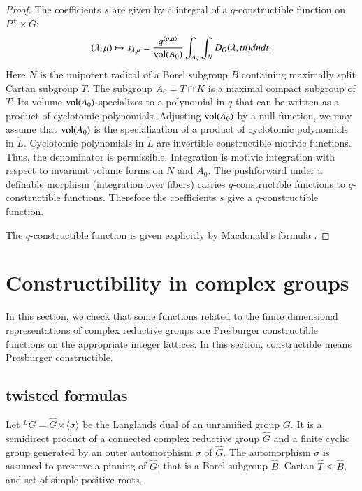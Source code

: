 \begin{proof} 
The coefficients $s$ are given by a integral of a $q$-constructible function on $P^+\times G$:
\[
(\lambda,\mu)\mapsto s_{\lambda,\mu}=\frac{q^{\langle \rho,\mu\rangle}}{{\operatorname{vol}}(A_0)} \int_{A_\mu} \int_N D_G(\lambda,t n) dn dt.
\]
Here $N$ is the unipotent radical of a Borel subgroup $B$ containing maximally split Cartan subgroup
$T$.  The subgroup $A_0 = T\cap K$ is a maximal compact subgroup of $T$.  Its volume ${\operatorname{vol}}(A_0)$ specializes
to a polynomial in $q$ that can be written as a product of cyclotomic polynomials.  Adjusting ${\operatorname{vol}}(A_0)$ by a 
null function, we may assume that ${\operatorname{vol}}(A_0)$ is the specialization of a product of cyclotomic polynomials in $\ring{L}$.
Cyclotomic polynomials in $\ring{L}$ are invertible constructible motivic functions.  Thus, the denominator is
permissible.  Integration is motivic integration with respect to invariant volume forms on $N$ and $A_0$.
The pushforward under a definable morphism (integration over fibers) carries $q$-constructible functions
to $q$-constructible functions.
Therefore the coefficients $s$ give a $q$-constructible function.

The $q$-constructible function is given explicitly by Macdonald's formula \cite{casselman1980unramified}.
\end{proof}


\section{Constructibility in complex groups}

In this section, we check that some functions related to the finite dimensional representations of complex reductive groups
are Presburger constructible functions on the appropriate integer lattices.  In this section, constructible means Presburger
constructible.



\subsection{twisted formulas}

Let ${}^LG = \hat G \rtimes \langle\sigma\rangle$ be the Langlands dual of an unramified group $G$.
It is a semidirect product of a connected complex reductive group $\hat G$ and a finite cyclic group
generated by an outer automorphism $\sigma$ of $\hat G$.  The automorphism $\sigma$ is assumed
to preserve a pinning of $\hat G$; that is a Borel subgroup $\hat B$, Cartan $\hat T\le \hat B$, and
set of simple positive roots.  

